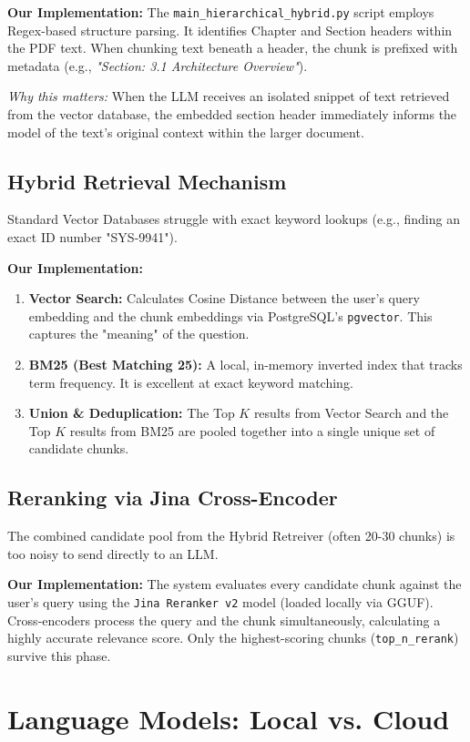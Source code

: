 \documentclass[11pt, a4paper]{article}
\begin{document}
\textbf{Our Implementation:} The \texttt{main\_hierarchical\_hybrid.py} script employs Regex-based structure parsing. It identifies Chapter and Section headers within the PDF text. When chunking text beneath a header, the chunk is prefixed with metadata (e.g., \textit{"Section: 3.1 Architecture Overview"}). 

\textit{Why this matters:} When the LLM receives an isolated snippet of text retrieved from the vector database, the embedded section header immediately informs the model of the text's original context within the larger document.

\subsection{Hybrid Retrieval Mechanism}
Standard Vector Databases struggle with exact keyword lookups (e.g., finding an exact ID number "SYS-9941").

\textbf{Our Implementation:}
\begin{enumerate}
    \item \textbf{Vector Search:} Calculates Cosine Distance between the user's query embedding and the chunk embeddings via PostgreSQL's \texttt{pgvector}. This captures the "meaning" of the question.
    \item \textbf{BM25 (Best Matching 25):} A local, in-memory inverted index that tracks term frequency. It is excellent at exact keyword matching.
    \item \textbf{Union \& Deduplication:} The Top $K$ results from Vector Search and the Top $K$ results from BM25 are pooled together into a single unique set of candidate chunks.
\end{enumerate}

\subsection{Reranking via Jina Cross-Encoder}
The combined candidate pool from the Hybrid Retreiver (often 20-30 chunks) is too noisy to send directly to an LLM. 

\textbf{Our Implementation:} The system evaluates every candidate chunk against the user's query using the \texttt{Jina Reranker v2} model (loaded locally via GGUF). Cross-encoders process the query and the chunk simultaneously, calculating a highly accurate relevance score. Only the highest-scoring chunks (\texttt{top\_n\_rerank}) survive this phase.

\section{Language Models: Local vs. Cloud}
\end{document}
